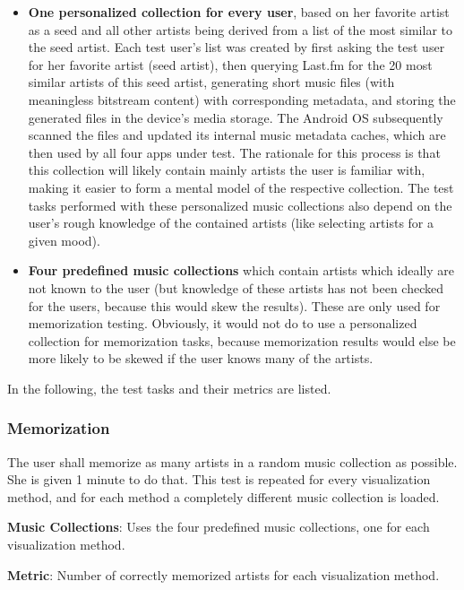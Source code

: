 \begin{itemize}
	\item \textbf{One personalized collection for every user}, based on her favorite artist as a seed and all other artists being derived from a list of the most similar to the seed artist. Each test user's list was created by first asking the test user for her favorite artist (seed artist), then querying Last.fm for the 20 most similar artists of this seed artist, generating short music files (with meaningless bitstream content) with corresponding metadata, and storing the generated files in the device's media storage. The Android OS subsequently scanned the files and updated its internal music metadata caches, which are then used by all four apps under test. The rationale for this process is that this collection will likely contain mainly artists the user is familiar with, making it easier to form a mental model of the respective collection. The test tasks performed with these personalized music collections also depend on the user's rough knowledge of the contained artists (like selecting artists for a given mood).
	\item \textbf{Four predefined music collections} which contain artists which ideally are not known to the user (but knowledge of these artists has not been checked for the users, because this would skew the results). These are only used for memorization testing. Obviously, it would not do to use a personalized collection for memorization tasks, because memorization results would else be more likely to be skewed if the user knows many of the artists.
\end{itemize}

In the following, the test tasks and their metrics are listed. 


\subsubsection{Memorization}

The user shall memorize as many artists in a random music collection as possible. She is given 1 minute to do that. This test is repeated for every visualization method, and for each method a completely different music collection is loaded.

\textbf{Music Collections}: Uses the four predefined music collections, one for each visualization method.

\textbf{Metric}: Number of correctly memorized artists for each visualization method.

